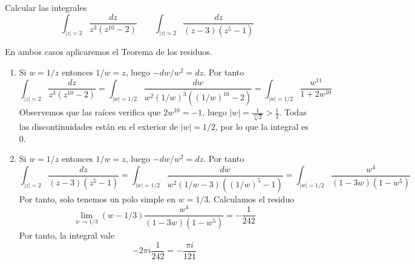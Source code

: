 \documentclass[twoside]{article}
\begin{document}
\newpage
\begin{ejercicio}{6}
Calcular las integrales
$$
\int_{|z|=2}\frac{dz}{z^3(z^{10}-2)} \qquad \int_{|z|=2}\frac{dz}{(z-3)(z^5-1)}
$$
\end{ejercicio}
\begin{solucion}
En ambos casos aplicaremos el Teorema de los residuos.
\begin{enumerate}
\item Si $w = 1/z$ entonces $1/w = z$, luego $-dw/w^2 = dz$. Por tanto 
$$
\int_{|z|=2}\frac{dz}{z^3(z^{10}-2)}= \int_{|w|=1/2} \frac{dw}{w^2 (1/w)^3((1/w)^{10}-2)} = \int_{|w|=1/2}\frac{w^{11}}{1+2w^{10}}
$$
Observemos que las raíces verifica que $2w^{10} = -1$, luego $|w| = \frac{1}{\sqrt[10]{2}} > \frac{1}{2}$. Todas las discontinuidades están en el exterior de $|w|=1/2$, por lo que la integral es $0$.
\item Si $w = 1/z$ entonces $1/w = z$, luego $-dw/w^2 = dz$. Por tanto 
$$
\int_{|z|=2}\frac{dz}{(z-3)(z^5-1)}= \int_{|w|=1/2} \frac{dw}{w^2 (1/w-3)((1/w)^{5}-1)} = \int_{|w|=1/2}\frac{w^{4}}{(1-3w)(1-w^5)}
$$
Por tanto, solo tenemos un polo simple en $w=1/3$. Calculamos el residuo
$$
\lim_{w\to 1/3} (w-1/3)\frac{w^4}{(1-3w)(1-w^5)} = -\frac{1}{242}
$$
Por tanto, la integral vale
$$-2\pi i \frac{1}{242} = -\frac{\pi i}{121}$$
\end{enumerate}
\end{solucion}
\newpage
\end{document}
